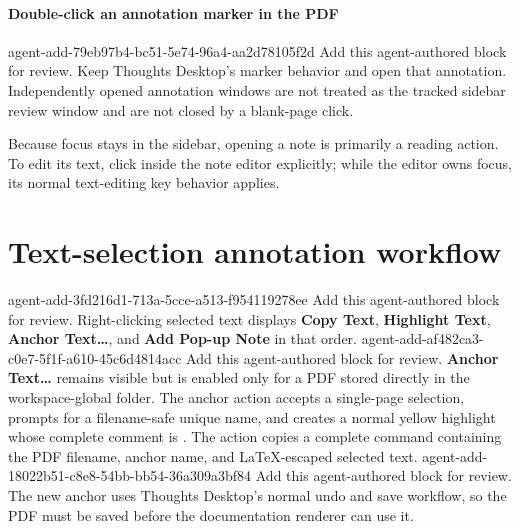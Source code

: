 \paragraph{Double-click an annotation marker in the PDF}
\agentProposedEdit
  {agent-add-79eb97b4-bc51-5e74-96a4-aa2d78105f2d}
  {Add this agent-authored block for review.}
  {}
  {Keep Thoughts Desktop's marker behavior and open that annotation.}
Independently opened annotation windows are not treated as the tracked sidebar review window and are not closed by a blank-page click.

Because focus stays in the sidebar, opening a note is primarily a reading action.
To edit its text, click inside the note editor explicitly; while the editor owns focus, its normal text-editing key behavior applies.

\section*{Text-selection annotation workflow}

\agentProposedEdit
  {agent-add-3fd216d1-713a-5cce-a513-f954119278ee}
  {Add this agent-authored block for review.}
  {}
  {Right-clicking selected text displays \textbf{Copy Text}, \textbf{Highlight Text}, \textbf{Anchor Text\ldots}, and \textbf{Add Pop-up Note} in that order.}
\agentProposedEdit
  {agent-add-af482ca3-c0e7-5f1f-a610-45c6d4814acc}
  {Add this agent-authored block for review.}
  {}
  {\textbf{Anchor Text\ldots} remains visible but is enabled only for a PDF stored directly in the workspace-global  folder.
The anchor action accepts a single-page selection, prompts for a filename-safe unique name, and creates a normal yellow highlight whose complete comment is .
The action copies a complete \code{\PdfLink} command containing the PDF filename, anchor name, and LaTeX-escaped selected text.}
\agentProposedEdit
  {agent-add-18022b51-c8e8-54bb-bb54-36a309a3bf84}
  {Add this agent-authored block for review.}
  {}
  {The new anchor uses Thoughts Desktop's normal undo and save workflow, so the PDF must be saved before the documentation renderer can use it.}

